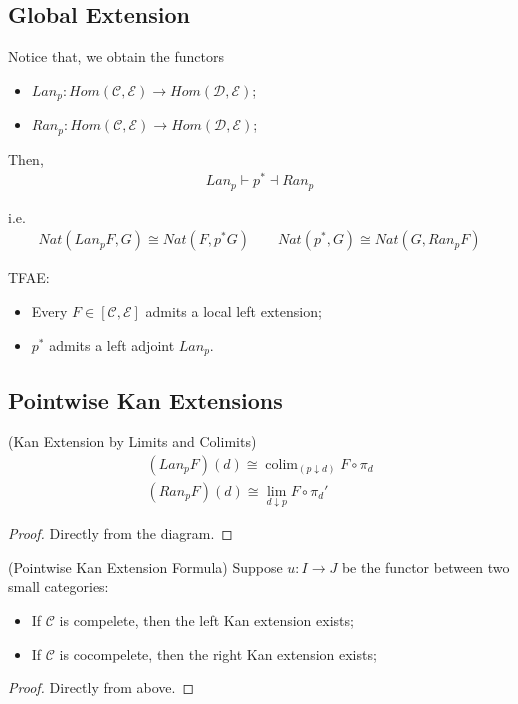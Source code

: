 \documentclass[Total.tex]{subfiles}
\begin{document}
			\subsection{Global Extension}
			\begin{Def}  Notice that, we obtain the functors 
				\begin{itemize}
					\item $Lan_p:Hom(\mathcal{C},\mathcal{E})\rightarrow Hom(\mathcal{D},\mathcal{E})$;
					\item  $Ran_p:Hom(\mathcal{C},\mathcal{E})\rightarrow Hom(\mathcal{D},\mathcal{E})$;
				\end{itemize}
				
				Then,
				\begin{gather*}
					Lan_p\vdash p^*\dashv Ran_p
				\end{gather*}
				
				i.e.
				\begin{gather*}
					Nat(Lan_p F,G)\cong Nat(F,p^* G)\qquad Nat(p^*,G)\cong Nat(G,Ran_p F)
				\end{gather*}
			\end{Def}
			
			\begin{proposition}
				TFAE:
				\begin{itemize}
					\item Every $F\in [\mathcal{C},\mathcal{E}]$ admits a local left extension;
					\item $p^*$ admits a left adjoint $Lan_p$.
				\end{itemize}
			\end{proposition}
			\subsection{Pointwise Kan Extensions}
			
			\begin{lemma}
				(Kan Extension by Limits and Colimits)
				\begin{gather*}
					(Lan_p F)(d)\cong \operatorname{colim}_{(p\downarrow d)} F\circ \pi_d\\
					(Ran_p F)(d)\cong \lim_{d\downarrow p} F\circ \pi_d'
				\end{gather*}
			\end{lemma}
			\begin{proof}
				Directly from the diagram. 
			\end{proof}
			
			\begin{theorem}
				(Pointwise Kan Extension Formula) Suppose $u:I\rightarrow J$ be the functor between two small categories:
				\begin{itemize}
					\item If $\mathcal{C}$ is compelete, then the left Kan extension exists;
					\item If $\mathcal{C}$ is cocompelete, then the right Kan extension exists;
				\end{itemize}
			\end{theorem}
			\begin{proof}
				Directly from above. 
			\end{proof}
			
\end{document}
